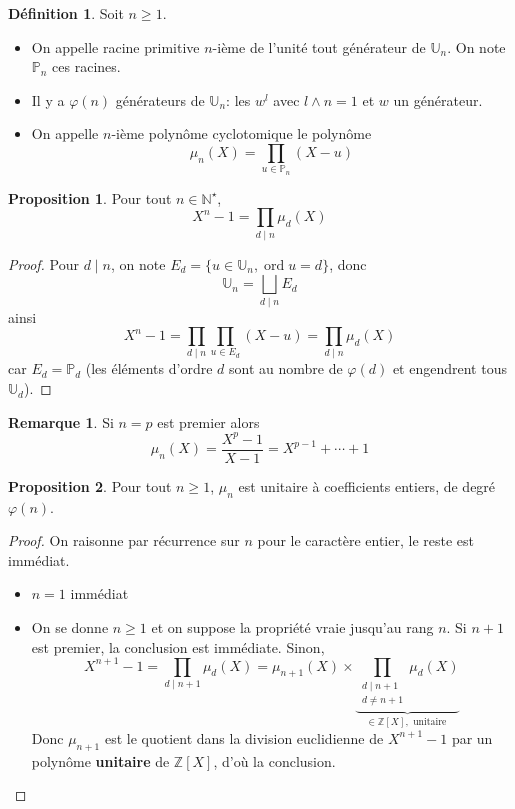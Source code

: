 \documentclass{article}
\theoremstyle{definition}
\newtheorem*{dfn}{Définition}
\newtheorem*{rem}{Remarque}
\newtheorem*{prop}{Proposition}
\DeclareMathOperator{\ord}{ord}
\begin{document}
\begin{dfn}
Soit $n\geq 1$. \begin{itemize}
    \item On appelle racine primitive $n$-ième de l'unité tout générateur de $\mathbb U_n$. On note $\mathbb P_n$ ces racines.
    \item Il y a $\varphi(n)$ générateurs de $\mathbb U_n$: les $w^l$ avec $l\land n=1$ et $w$ un générateur.
    \item On appelle $n$-ième polynôme cyclotomique le polynôme \[
        \mu_n(X)=\prod_{u\in\mathbb P_n}(X-u)
    \]
\end{itemize}
\end{dfn}

\begin{prop}
Pour tout $n\in\mathbb N^\star$, \[
    X^n-1=\prod_{d\;|\;n}\mu_d(X)
\]
\end{prop}

\begin{proof}
Pour $d\;|\;n$, on note $E_d=\{u\in\mathbb U_n, \ord u=d\}$, donc \[
    \mathbb U_n =\bigsqcup_{d\;|\;n}E_d
\]
ainsi \[
    X^n-1=\prod_{d\;|\; n}\prod_{u\in E_d}(X-u)=\prod_{d\;|\;n}\mu_d(X)
\]
car $E_d=\mathbb P_d$ (les éléments d'ordre $d$ sont au nombre de $\varphi(d)$ et engendrent tous $\mathbb U_d$).
\end{proof}

\begin{rem}
Si $n=p$ est premier alors \[
    \mu_n(X)=\frac{X^p-1}{X-1}=X^{p-1}+\cdots +1
\]
\end{rem}

\begin{prop}
Pour tout $n\geq 1$, $\mu_n$ est unitaire à coefficients entiers, de degré $\varphi(n)$.
\end{prop}

\begin{proof}
On raisonne par récurrence sur $n$ pour le caractère entier, le reste est immédiat.
\begin{itemize}
    \item $n=1$ immédiat
    \item On se donne $n\geq 1$ et on suppose la propriété vraie jusqu'au rang $n$. Si $n+1$ est premier, la conclusion est immédiate. Sinon, \[
        X^{n+1}-1=\prod_{d\;|\;n+1}\mu_d(X)=\mu_{n+1}(X)\times
        \underbrace{\prod_{\substack{d\;|\;n+1\\ d\neq n+1}}\mu_d(X)}_{\in\mathbb Z[X], \text{ unitaire }}
    \]
    Donc $\mu_{n+1}$ est le quotient dans la division euclidienne de $X^{n+1}-1$ par un polynôme \textbf{unitaire} de $\mathbb Z[X]$, d'où la conclusion.
\end{itemize}
\end{proof}
\end{document}
